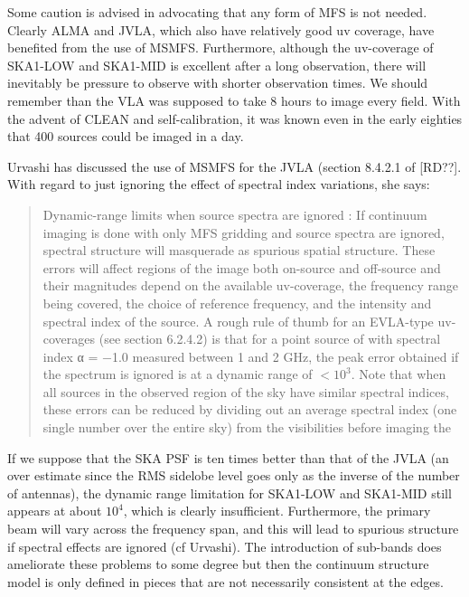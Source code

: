 \documentclass[11pt,a4paper,variablewidth]{article}
\begin{document}
Some caution is advised in advocating that any form of MFS is not needed. Clearly ALMA and JVLA, which also have relatively good uv coverage, have benefited from the use of MSMFS. Furthermore, although the uv-coverage of SKA1-LOW and SKA1-MID is excellent after a long observation, there will inevitably be pressure to observe with shorter observation times. We should remember than the VLA was supposed to take 8 hours to image every field. With the advent of CLEAN and self-calibration, it was known even in the early eighties that 400 sources could be imaged in a day.

Urvashi has discussed the use of MSMFS for the JVLA (section 8.4.2.1 of [RD??]. With regard to just ignoring the effect of spectral index variations, she says:

\begin{quotation}

Dynamic-range limits when source spectra are ignored : If continuum imaging is done with only MFS gridding and source spectra are ignored, spectral structure will masquerade as spurious spatial structure. These errors will affect regions of the image both on-source and off-source and their magnitudes depend on the available uv-coverage, the frequency range being covered, the choice of reference frequency, and the intensity and spectral index of the source. A rough rule of thumb for an EVLA-type uv-coverages (see section 6.2.4.2) is that for a point source of with spectral index α = −1.0 measured between 1 and 2 GHz, the peak error obtained if the spectrum is ignored is at a dynamic range of $ < 10^3$. Note that when all sources in the observed region of the sky have similar spectral indices, these errors can be reduced by dividing out an average spectral index (one single number over the entire sky) from the visibilities before imaging the\end{quotation}

If we suppose that the SKA PSF is ten times better than that of the JVLA (an over estimate since the RMS sidelobe level goes only as the inverse of the number of antennas), the dynamic range limitation for SKA1-LOW and SKA1-MID still appears at about $10^4$, which is clearly insufficient. Furthermore, the primary beam will vary across the frequency span, and this will lead to spurious structure if spectral effects are ignored (cf Urvashi). The introduction of sub-bands does ameliorate these problems to some degree but then the continuum structure model is only defined in pieces that are not necessarily consistent at the edges.
\end{document}
